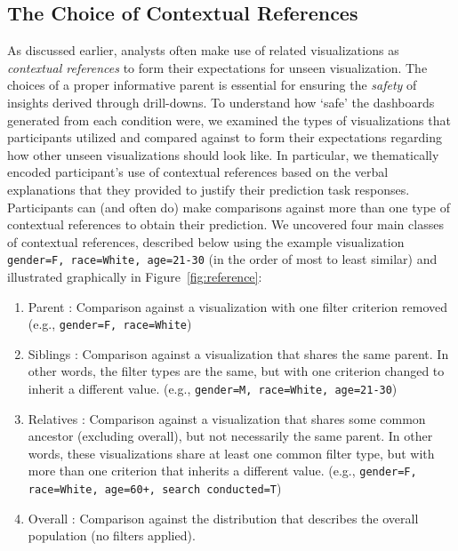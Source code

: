 \subsection{The Choice of Contextual References}
\par As discussed earlier, analysts often make use of related visualizations as \emph{contextual references} to form their expectations for unseen visualization. The choices of a proper informative parent is essential for ensuring the \emph{safety} of insights derived through drill-downs. To understand how `safe' the dashboards generated from each condition were, we examined the types of visualizations that participants utilized and compared against to form their expectations regarding how other unseen visualizations should look like. In particular, we thematically encoded participant's use of contextual references based on the verbal explanations that they provided to justify their prediction task responses. Participants can (and often do) make comparisons against more than one type of contextual references to obtain their prediction. We uncovered four main classes of contextual references, described below using the example visualization \texttt{gender=F, race=White, age=21-30} (in the order of most to least similar) and illustrated graphically in Figure~\ref{fig:reference}:
\begin{enumerate}
	\item Parent : Comparison against a visualization with one filter criterion removed (e.g., \texttt{gender=F, race=White})
	\item Siblings : Comparison against a visualization that shares the same parent. In other words, the filter types are the same, but with one criterion changed to inherit a different value. (e.g., \texttt{gender=M, race=White, age=21-30})
	\item Relatives : Comparison against a visualization that shares some common ancestor (excluding overall), but not necessarily the same parent. In other words, these visualizations share at least one common filter type, but with more than one criterion that inherits a different value. (e.g., \texttt{gender=F, race=White, age=60+, search conducted=T})
	\item Overall : Comparison against the distribution that describes the overall population (no filters applied).
\end{enumerate}
